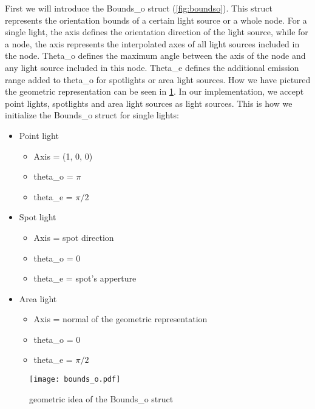 First we will introduce the Bounds\_o struct (\ref{fig:boundso}). This struct represents the orientation bounds of a certain light source or a whole node. For a single light, the axis defines the orientation direction of the light source, while for a node, the axis represents the interpolated axes of all light sources included in the node. Theta\_o defines the maximum angle between the axis of the node and any light source included in this node. Theta\_e defines the additional emission range added to theta\_o for spotlights or area light sources. How we have pictured the geometric representation can be seen in \ref{fig:boundsogeo}. In our implementation, we accept point lights, spotlights and area light sources as light sources. This is how we initialize the Bounds\_o struct for single lights:

\begin{itemize}
	  \setlength\itemsep{0em}
	\item Point light
	\begin{itemize}
		  \setlength\itemsep{0em}
		\item Axis = (1, 0, 0)
		\item theta\_o = $\pi$
		\item theta\_e = $\pi/2$
	\end{itemize}
	\item Spot light
	\begin{itemize}
		  \setlength\itemsep{0em}
		\item Axis = spot direction
		\item theta\_o = 0
		\item theta\_e = spot's apperture
	\end{itemize}
	\item Area light
	\begin{itemize}
		  \setlength\itemsep{0em}
		\item Axis = normal of the geometric representation
		\item theta\_o = 0
		\item theta\_e = $\pi/2$
	\end{itemize}
\end{itemize}

\begin{figure}
	\begin{center}
		\texttt{[image: bounds\_o.pdf]}
		\caption{geometric idea of the Bounds\_o struct}
		\label{fig:boundsogeo}
	\end{center}
\end{figure}

